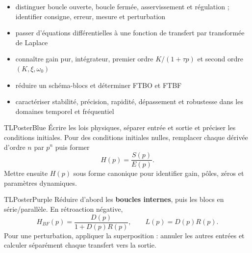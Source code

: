 \documentclass[10pt,a3paper]{article}
\begin{document}
\vspace{2mm}
\begin{minipage}[t]{0.61\linewidth}
\begin{TLPosterSavoirs}
\begin{itemize}
  \item distinguer boucle ouverte, boucle fermée, asservissement et régulation ; identifier consigne, erreur, mesure et perturbation
  \item passer d'équations différentielles à une fonction de transfert par transformée de Laplace
  \item connaître gain pur, intégrateur, premier ordre $K/(1+\tau p)$ et second ordre $(K,\xi,\omega_0)$
  \item réduire un schéma-blocs et déterminer FTBO et FTBF
  \item caractériser stabilité, précision, rapidité, dépassement et robustesse dans les domaines temporel et fréquentiel
\end{itemize}
\end{TLPosterSavoirs}
\end{minipage}\hfill
\begin{minipage}[t]{0.36\linewidth}
\end{minipage}
\vfill
\begin{minipage}[t]{0.49\linewidth}
\begin{TLPosterBloc}{TLPosterBlue}
Écrire les lois physiques, séparer entrée et sortie et préciser les conditions initiales. Pour des conditions initiales nulles, remplacer chaque dérivée d'ordre $n$ par $p^n$ puis former
\[
H(p)=\frac{S(p)}{E(p)}.
\]
Mettre ensuite $H(p)$ sous forme canonique pour identifier gain, pôles, zéros et paramètres dynamiques.
\end{TLPosterBloc}
\begin{TLPosterBloc}{TLPosterPurple}
Réduire d'abord les \textbf{boucles internes}, puis les blocs en série/parallèle. En rétroaction négative,
\[
H_{BF}(p)=\frac{D(p)}{1+D(p)R(p)},\qquad L(p)=D(p)R(p).
\]
Pour une perturbation, appliquer la superposition : annuler les autres entrées et calculer séparément chaque transfert vers la sortie.
\end{TLPosterBloc}
\end{minipage}\hfill
\end{document}
